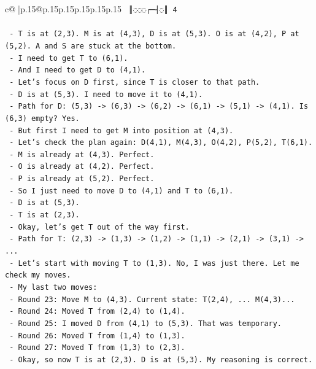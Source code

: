 \documentclass{article}
\begin{document}
{\begin{supertabular}{c@{$\;$}|p{.15\linewidth}@{}p{.15\linewidth}p{.15\linewidth}p{.15\linewidth}p{.15\linewidth}p{.15\linewidth}}
{{{\texttt{   ║◌◌◌┌─┤◌║ 4} \\
\\ 
\texttt{   {-} T is at (2,3). M is at (4,3), D is at (5,3). O is at (4,2), P at (5,2). A and S are stuck at the bottom.} \\
\texttt{   {-} I need to get T to (6,1).} \\
\texttt{   {-} And I need to get D to (4,1).} \\
\texttt{   {-} Let's focus on D first, since T is closer to that path.} \\
\texttt{   {-} D is at (5,3). I need to move it to (4,1).} \\
\texttt{   {-} Path for D: (5,3) {-}> (6,3) {-}> (6,2) {-}> (6,1) {-}> (5,1) {-}> (4,1). Is (6,3) empty? Yes.} \\
\texttt{   {-} But first I need to get M into position at (4,3).} \\
\texttt{   {-} Let's check the plan again: D(4,1), M(4,3), O(4,2), P(5,2), T(6,1).} \\
\texttt{   {-} M is already at (4,3). Perfect.} \\
\texttt{   {-} O is already at (4,2). Perfect.} \\
\texttt{   {-} P is already at (5,2). Perfect.} \\
\texttt{   {-} So I just need to move D to (4,1) and T to (6,1).} \\
\texttt{   {-} D is at (5,3).} \\
\texttt{   {-} T is at (2,3).} \\
\texttt{   {-} Okay, let's get T out of the way first.} \\
\texttt{   {-} Path for T: (2,3) {-}> (1,3) {-}> (1,2) {-}> (1,1) {-}> (2,1) {-}> (3,1) {-}> ...} \\
\texttt{   {-} Let's start with moving T to (1,3). No, I was just there. Let me check my moves.} \\
\texttt{   {-} My last two moves:} \\
\texttt{     {-} Round 23: Move M to (4,3). Current state: T(2,4), ... M(4,3)...} \\
\texttt{     {-} Round 24: Moved T from (2,4) to (1,4).} \\
\texttt{     {-} Round 25: I moved D from (4,1) to (5,3). That was temporary.} \\
\texttt{     {-} Round 26: Moved T from (1,4) to (1,3).} \\
\texttt{     {-} Round 27: Moved T from (1,3) to (2,3).} \\
\texttt{   {-} Okay, so now T is at (2,3). D is at (5,3). My reasoning is correct.} \\
}}}
\end{supertabular}}
\end{document}
